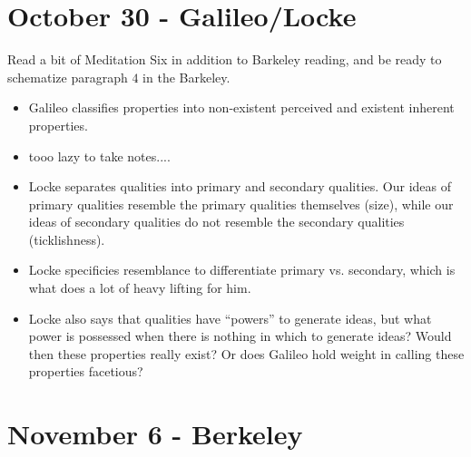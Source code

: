 \documentclass{report}
\begin{document}
\section{October 30 - Galileo/Locke}

Read a bit of Meditation Six in addition to Barkeley reading, and be ready to schematize paragraph $4$ in the Barkeley.

\begin{itemize}
\item Galileo classifies properties into non-existent perceived and existent inherent properties. 
\item tooo lazy to take notes....
\item Locke separates qualities into primary and secondary qualities. Our ideas of primary qualities resemble the primary qualities themselves (size), while our ideas of secondary qualities do not resemble the secondary qualities (ticklishness). 
\item Locke specificies resemblance to differentiate primary vs. secondary, which is what does a lot of heavy lifting for him.
\item Locke also says that qualities have ``powers'' to generate ideas, but what power is possessed when there is nothing in which to generate ideas? Would then these properties really exist? Or does Galileo hold weight in calling these properties facetious?
\end{itemize}

\section{November 6 - Berkeley}
\end{document}
